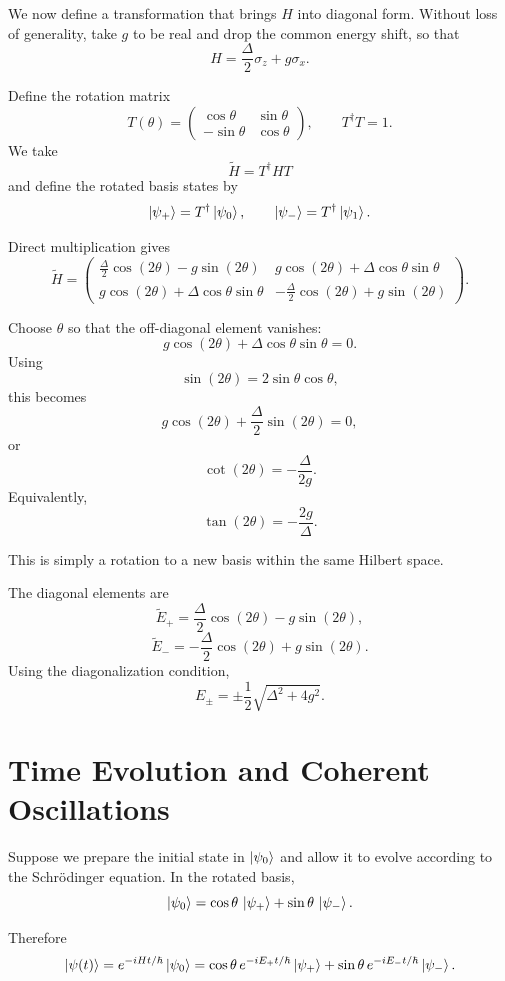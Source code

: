 \documentclass[11pt]{article}
\begin{document}
We now define a transformation that brings $H$ into diagonal form. Without
loss of generality, take $g$ to be real and drop the common energy shift,
so that
\[
H
=
\frac{\Delta}{2}\sigma_z
+
g\sigma_x.
\]

Define the rotation matrix
\[
T(\theta)
=
\begin{pmatrix}
\cos\theta & \sin\theta\\
-\sin\theta & \cos\theta
\end{pmatrix},
\qquad
T^\dagger T=1.
\]
We take
\[
\widetilde H=T^\dagger H T
\]
and define the rotated basis states by
\[
\ket{\psi_+}=T^\dagger\ket{\psi_0},
\qquad
\ket{\psi_-}=T^\dagger\ket{\psi_1}.
\]

Direct multiplication gives
\[
\widetilde H
=
\begin{pmatrix}
\frac{\Delta}{2}\cos(2\theta)-g\sin(2\theta)
&
g\cos(2\theta)+\Delta\cos\theta\sin\theta
\\[0.5em]
g\cos(2\theta)+\Delta\cos\theta\sin\theta
&
-\frac{\Delta}{2}\cos(2\theta)+g\sin(2\theta)
\end{pmatrix}.
\]

Choose $\theta$ so that the off-diagonal element vanishes:
\[
g\cos(2\theta)
+
\Delta\cos\theta\sin\theta
=
0.
\]
Using
\[
\sin(2\theta)=2\sin\theta\cos\theta,
\]
this becomes
\[
g\cos(2\theta)
+
\frac{\Delta}{2}\sin(2\theta)
=
0,
\]
or
\[
\boxed{
\cot(2\theta)
=
-\frac{\Delta}{2g}
}.
\]
Equivalently,
\[
\tan(2\theta)=-\frac{2g}{\Delta}.
\]

This is simply a rotation to a new basis within the same Hilbert space.

The diagonal elements are
\[
\widetilde E_+
=
\frac{\Delta}{2}\cos(2\theta)
-
g\sin(2\theta),
\]
\[
\widetilde E_-
=
-\frac{\Delta}{2}\cos(2\theta)
+
g\sin(2\theta).
\]
Using the diagonalization condition,
\[
\boxed{
E_\pm
=
\pm\frac{1}{2}\sqrt{\Delta^2+4g^2}
}.
\]

\section{Time Evolution and Coherent Oscillations}

Suppose we prepare the initial state in $\ket{\psi_0}$ and allow it to evolve
according to the Schr\"odinger equation. In the rotated basis,
\[
\ket{\psi_0}
=
\cos\theta\,\ket{\psi_+}
+
\sin\theta\,\ket{\psi_-}.
\]

Therefore
\[
\ket{\psi(t)}
=
e^{-iHt/\hbar}\ket{\psi_0}
=
\cos\theta\,
e^{-iE_+t/\hbar}\ket{\psi_+}
+
\sin\theta\,
e^{-iE_-t/\hbar}\ket{\psi_-}.
\]
\end{document}
